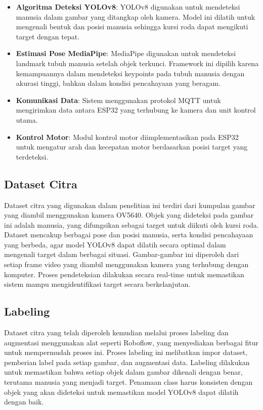 \begin{itemize}[nolistsep]
    \item \textbf{Algoritma Deteksi YOLOv8}: YOLOv8 digunakan untuk mendeteksi manusia dalam gambar yang ditangkap oleh kamera. Model ini dilatih untuk mengenali bentuk dan posisi manusia sehingga kursi roda dapat mengikuti target dengan tepat.
    \item \textbf{Estimasi Pose MediaPipe}: MediaPipe digunakan untuk mendeteksi landmark tubuh manusia setelah objek terkunci. Framework ini dipilih karena kemampuannya dalam mendeteksi keypoints pada tubuh manusia dengan akurasi tinggi, bahkan dalam kondisi pencahayaan yang beragam.
    \item \textbf{Komunikasi Data}: Sistem menggunakan protokol MQTT untuk mengirimkan data antara ESP32 yang terhubung ke kamera dan unit kontrol utama.
    \item \textbf{Kontrol Motor}: Modul kontrol motor diimplementasikan pada ESP32 untuk mengatur arah dan kecepatan motor berdasarkan posisi target yang terdeteksi.
\end{itemize}

\subsection{Dataset Citra}
\label{subsec:datasetcitra}

Dataset citra yang digunakan dalam penelitian ini terdiri dari kumpulan gambar yang diambil menggunakan kamera OV5640. Objek yang dideteksi pada gambar ini adalah manusia, yang difungsikan sebagai target untuk diikuti oleh kursi roda. Dataset mencakup berbagai pose dan posisi manusia, serta kondisi pencahayaan yang berbeda, agar model YOLOv8 dapat dilatih secara optimal dalam mengenali target dalam berbagai situasi. Gambar-gambar ini diperoleh dari setiap frame video yang diambil menggunakan kamera yang terhubung dengan komputer. Proses pendeteksian dilakukan secara real-time untuk memastikan sistem mampu mengidentifikasi target secara berkelanjutan.

\subsection{Labeling}
\label{subsec:labeling}

Dataset citra yang telah diperoleh kemudian melalui proses labeling dan augmentasi menggunakan alat seperti Roboflow, yang menyediakan berbagai fitur untuk mempermudah proses ini. Proses labeling ini melibatkan impor dataset, pemberian label pada setiap gambar, dan augmentasi data. Labeling dilakukan untuk memastikan bahwa setiap objek dalam gambar dikenali dengan benar, terutama manusia yang menjadi target. Penamaan class harus konsisten dengan objek yang akan dideteksi untuk memastikan model YOLOv8 dapat dilatih dengan baik.

